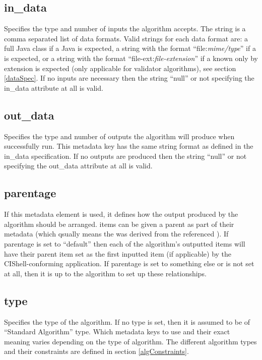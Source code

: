 \subsection*{in\_data}
Specifies the type and number of  inputs the
algorithm accepts. The string is a comma separated list of data formats. Valid strings
for each data format are: a full Java class if a Java  is
expected, a string with the format ``file:\textit{mime/type}'' if a
 is expected, or a string with the format
``file-ext:\textit{file-extension}'' if a  known only by
extension is expected (only applicable for validator algorithms), see section
\ref{dataSpec}. If no  inputs are necessary then the string
``null'' or not specifying the in\_data attribute at all is valid.

\subsection*{out\_data}
Specifies the type and number of  outputs
the algorithm will produce when successfully run. This metadata key has the same string format
as defined in the in\_data specification. If no  outputs are
produced then the string ``null'' or not specifying the out\_data attribute at
all is valid.

\subsection*{parentage}
If this metadata element is used, it defines how the output 
produced by the algorithm should be arranged.  items can be given a parent as
part of their metadata (which qsually means the  was derived from the
referenced ). If parentage is set to ``default'' then each of the
algorithm's outputted  items will have their parent  item
set as the first inputted  item (if applicable) by the
CIShell-conforming application. If parentage is set to something else or is not
set at all, then it is up to the algorithm to set up these relationships.

\subsection*{type}
Specifies the type of the algorithm. If no type is set, then
it is assumed to be of ``Standard Algorithm'' type. Which metadata keys to use and
their exact meaning varies depending on the type of algorithm. The different
algorithm types and their constraints are defined in section
\ref{algConstraints}.

